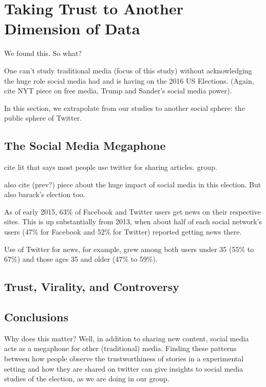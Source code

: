 \chapter{Taking Trust to Another Dimension of Data}

We found this.
So what?

One can't study traditional media (focus of this study) without acknowledging the huge role social media had and is having on the 2016 US Elections. (Again, cite NYT piece on free media, Trump and Sander's social media power).

In this section, we extrapolate from our studies to another social sphere: the public sphere of Twitter. 



\section{The Social Media Megaphone}
cite lit that says most people use twitter for sharing articles.
group. 

also cite (prev?) piece about the huge impact of social media in this election. But also barack's election too.



As of early 2015, 63\% of Facebook and Twitter users get news on their respective sites. This is up substantially from 2013, when about half of each social network’s users (47\% for Facebook and 52\% for Twitter) reported getting news there.

Use of Twitter for news, for example, grew among both users under 35 (55\% to 67\%) and those ages 35 and older (47\% to 59\%). \cite{Pew-news-sharing}


\section{Trust, Virality, and Controversy}

\section{Conclusions}

Why does this matter?
Well, in addition to sharing new content, social media acts as a megaphone for other (traditional) media. Finding these patterns between how people observe the trustworthiness of stories in a experimental setting and how they are shared on twitter can give insights to social media studies of the election, as we are doing in our group.


















